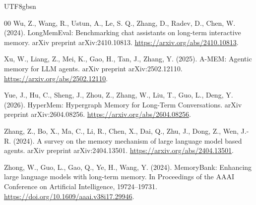 \documentclass[a4paper,fleqn]{cas-sc}
\begin{document}
\begin{CJK*}{UTF8}{gbsn}
\begin{thebibliography}{00}
Wu, Z., Wang, R., Ustun, A., Le, S. Q., Zhang, D., Radev, D., Chen, W. (2024). LongMemEval: Benchmarking chat assistants on long-term interactive memory. arXiv preprint arXiv:2410.10813. \url{https://arxiv.org/abs/2410.10813}.

Xu, W., Liang, Z., Mei, K., Gao, H., Tan, J., Zhang, Y. (2025). A-MEM: Agentic memory for LLM agents. arXiv preprint arXiv:2502.12110. \url{https://arxiv.org/abs/2502.12110}.

Yue, J., Hu, C., Sheng, J., Zhou, Z., Zhang, W., Liu, T., Guo, L., Deng, Y. (2026). HyperMem: Hypergraph Memory for Long-Term Conversations. arXiv preprint arXiv:2604.08256. \url{https://arxiv.org/abs/2604.08256}.

Zhang, Z., Bo, X., Ma, C., Li, R., Chen, X., Dai, Q., Zhu, J., Dong, Z., Wen, J.-R. (2024). A survey on the memory mechanism of large language model based agents. arXiv preprint arXiv:2404.13501. \url{https://arxiv.org/abs/2404.13501}.

Zhong, W., Guo, L., Gao, Q., Ye, H., Wang, Y. (2024). MemoryBank: Enhancing large language models with long-term memory. In Proceedings of the AAAI Conference on Artificial Intelligence, 19724--19731. \url{https://doi.org/10.1609/aaai.v38i17.29946}.

\end{thebibliography}

\end{CJK*}
\end{document}

